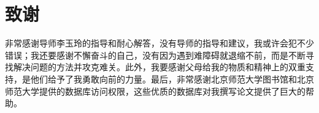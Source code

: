 \documentclass[a4paper,12pt]{article}
\numberwithin{equation}{section}
\begin{document}
\begin{appendix}
\end{appendix}
	\newpage
	\fontsize{12pt}{14.4}\selectfont\songti
\section*{致谢}
	非常感谢导师李玉玲的指导和耐心解答，没有导师的指导和建议，我或许会犯不少错误；我还要感谢不懈奋斗的自己，没有因为遇到难障碍就退缩不前，而是不断寻找解决问题的方法并攻克难关。此外，我要感谢父母给我的物质和精神上的双重支持，是他们给予了我勇敢向前的力量。最后，非常感谢北京师范大学图书馆和北京师范大学提供的数据库访问权限，这些优质的数据库对我撰写论文提供了巨大的帮助。
\end{document}
